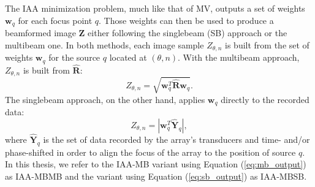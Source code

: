 The IAA minimization problem, much like that of MV, outputs a set of weights $\boldsymbol{w}_q$ for each focus point $q$.
Those weights can then be used to produce a beamformed image $\boldsymbol{Z}$ either following the singlebeam (SB) approach or the multibeam one.
In both methods, each image sample $Z_{\theta,n}$ is built from the set of weights $\boldsymbol{w}_q$ for the source $q$ located at $(\theta,n)$.
With the multibeam approach, $Z_{\theta,n}$ is built from $\boldsymbol{\hat{R}}$:
\begin{equation}
    Z_{\theta,n} = \sqrt{\boldsymbol{w}_q^T \boldsymbol{\hat{R}} \boldsymbol{w}_q}.
\label{eq:mb_output}
\end{equation}
\noindent
The singlebeam approach, on the other hand, applies $\boldsymbol{w}_q$ directly to the recorded data:
\begin{equation}
    Z_{\theta,n} = |\boldsymbol{w}_q^T \boldsymbol{\hat{Y}}_q |,
\label{eq:sb_output}
\end{equation}
\noindent
where $\boldsymbol{\hat{Y}}_q$ is the set of data recorded by the array's transducers and time- and/or phase-shifted in order to align the focus of the array to the position of source $q$.
In this thesis, we refer to the IAA-MB variant using Equation (\ref{eq:mb_output}) as IAA-MBMB and the variant using Equation (\ref{eq:sb_output}) as IAA-MBSB.